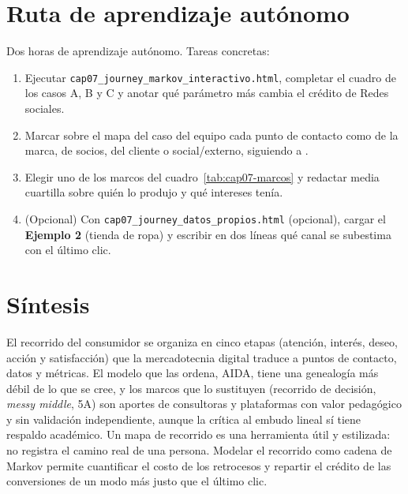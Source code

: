 \section{Ruta de aprendizaje autónomo}

Dos horas de aprendizaje autónomo. Tareas concretas:
\begin{enumerate}
  \item Ejecutar \texttt{cap07\_journey\_markov\_interactivo.html}, completar
  el cuadro de los casos A, B y C y anotar qué parámetro más cambia el crédito
  de Redes sociales.
  \item Marcar sobre el mapa del caso del equipo cada punto de contacto como
  de la marca, de socios, del cliente o social/externo, siguiendo a
  \textcite{lemon2016}.
  \item Elegir uno de los marcos del cuadro~\ref{tab:cap07-marcos} y redactar
  media cuartilla sobre quién lo produjo y qué intereses tenía.
  \item (Opcional) Con \texttt{cap07\_journey\_datos\_propios.html} (opcional), cargar el \textbf{Ejemplo 2} (tienda de ropa) y escribir en dos líneas qué canal se subestima con el último clic.
\end{enumerate}

\section{Síntesis}

El recorrido del consumidor se organiza en cinco etapas (atención, interés,
deseo, acción y satisfacción) que la mercadotecnia digital traduce a puntos
de contacto, datos y métricas. El modelo que las ordena, AIDA, tiene una
genealogía más débil de lo que se cree, y los marcos que lo sustituyen
(recorrido de decisión, \textit{messy middle}, 5A) son aportes de consultoras
y plataformas con valor pedagógico y sin validación independiente, aunque la
crítica al embudo lineal sí tiene respaldo académico. Un mapa de recorrido es
una herramienta útil y estilizada: no registra el camino real de una persona.
Modelar el recorrido como cadena de Markov permite cuantificar el costo de los
retrocesos y repartir el crédito de las conversiones de un modo más justo que
el último clic.

